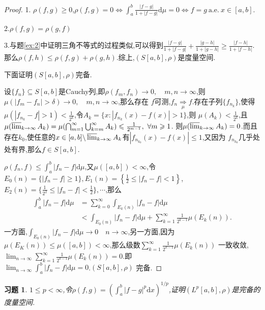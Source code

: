 \documentclass[a4paper,oneside,12pt]{ctexart}
\theoremstyle{plain}
\newtheorem{exercise}{习题}
\theoremstyle{nonumberplain}
\theoremstyle{nonumberplain}
\newtheorem{proof}{证明.}
\newcommand{\dif}{\mathrm{d}}
\newcommand{\differ}{\backslash}
\newcommand{\abs}[1]{\left\vert#1\right\vert}
\renewcommand{\limsup}{\varlimsup}
\renewcommand{\ae}{\ \mathrm{a.e.}\ }
\newcommand{\toinmeasure}[1]{\underset{#1}{\Rightarrow}}
\begin{document}
\begin{proof}
    1. $\rho(f,g)\geqslant 0$,$\rho(f,g)=0\Leftrightarrow \int_a^b\frac{\abs{f-g}}{1+\abs{f-g}}\dif \mu=0\Leftrightarrow f=g \ae x\in[a,b]$.

    2.$\rho(f,g)=\rho(g,f)$

    3.与题\eqref{ex:2}中证明三角不等式的过程类似,可以得到$\frac{\abs{f-g}}{1+\abs{f-g}}+\frac{\abs{g-h}}{1+\abs{g-h}}\geqslant\frac{\abs{f-h}}{1+\abs{f-h}}$.
    那么$\rho(f,h)\leqslant\rho(f,g)+\rho(g,h)$.综上,$(S[a,b],\rho)$是度量空间.

    下面证明$(S[a,b],\rho)$完备.

    设$\{f_n\}\subseteq S[a,b]$是Cauchy列,即$\rho(f_m,f_n)\to 0,\quad m,n\to\infty$,则$\mu(\abs{f_m-f_n}>\delta)\to 0,\quad m,n\to\infty$,那么存在
    $f$可测,$f_n\toinmeasure{\mu} f$.存在子列$\{f_{n_k}\}$,使得$\mu(\abs{f_{n_k}-f}>1)<\frac{1}{2^k}$,令$A_k=\{x:\abs{f_{n_k}(x)-f(x)}>1\}$,则
    $\mu(A_{k})<\frac{1}{2^k}$,且$\mu(\limsup_{k\to\infty} A_k)=\mu(\bigcap_{m=1}^\infty\bigcup_{k=m}^\infty A_k)\leqslant \frac{1}{2^{m-1}},\ \forall m\geqslant 1$.
    则$\mu(\limsup_{k\to\infty} A_k)=0$.而且存在$k_0$,使任意的$x\in[a,b]\differ\limsup_{k\to\infty} A_k$有$\abs{f_{n_{k_0}}(x)-f(x)}\leqslant 1$,又因为
    $f_{n_{k_0}}$几乎处处有界,那么$f\in S[a,b]$.

    $\rho(f_n,f)\leqslant\int_a^b\abs{f_n-f}\dif \mu$,又$\mu([a,b])<\infty$,令$E_0(n)=\{\abs{f_n-f}\geqslant 1\},E_1(n)=\left\{\frac{1}{2}\leqslant\abs{f_n-f}<1\right\}$,
    $E_2(n)=\{\frac{1}{2^2}\leqslant\abs{f_n-f}<\frac{1}{2}\},\cdots$,那么 
    \begin{align*}
        \int_a^b\abs{f_n-f}\dif \mu&=\sum_{k=0}^\infty \int_{E_k(n)}\abs{f_n-f}\dif \mu\\
        &<\int_{E_0(n)}\abs{f_n-f}\dif \mu+\sum_{k=1}^\infty\frac{1}{2^{k-1}}\mu(E_k(n)).
    \end{align*}
一方面,$\int_{E_0(n)}\abs{f_n-f}\dif \mu\to 0\quad n\to\infty$,另一方面,因为$\mu(E_K(n))\leqslant\mu([a,b])<\infty$,那么级数$\sum_{k=1}^\infty \frac{1}{2^{k-1}}\mu(E_k(n))$
一致收敛,$\lim_{n\to\infty}\sum_{k=1}^\infty \frac{1}{2^{k-1}}\mu(E_k(n))=0$.即\\$\lim_{n\to\infty}\int_a^b\abs{f_n-f}\dif\mu=0$.$(S[a,b],\rho)$
完备.
\end{proof}

\begin{exercise}
    \label{ex:4}
    $1\leqslant p< \infty$,令$\rho(f,g)=\left(\int_a^b\abs{f-g}^p\dif x\right)^{1/p}$,证明$(L^p[a,b],\rho)$是完备的度量空间.
\end{exercise}
\end{document}
